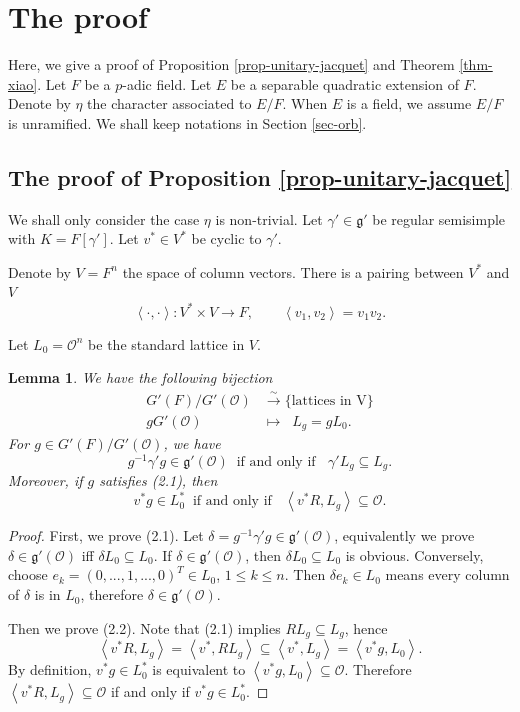 \documentclass[a4paper]{amsart}
\newcommand{\CO}{{\mathcal {O}}} \newcommand{\CP}{{\mathcal {P}}}
\newcommand{\fg}{{\mathfrak{g}}} \newcommand{\fh}{{\mathfrak{h}}}
\newcommand{\lra}{\longrightarrow}\newcommand{\lla}{\longleftarrow}
\theoremstyle{plain}
\newtheorem{lem}[thm]{Lemma}  \newtheorem{prop}[thm]{Proposition}
\theoremstyle{remark} \newtheorem{remark}[thm]{Remark}
\theoremstyle{exercise} \newtheorem{exercise}[thm]{Exercise}
\theoremstyle{example} \newtheorem{example}[thm]{Example}
\theoremstyle{question} \newtheorem{question}[thm]{Question}
\theoremstyle{assumption} \newtheorem{assumption}[thm]{Assumption}
\numberwithin{equation}{section}
\begin{document}
\section{The proof}

Here, we give a proof of Proposition \ref{prop-unitary-jacquet} and Theorem \ref{thm-xiao}. Let $F$ be a $p$-adic field. Let $E$ be a separable quadratic extension of $F$. Denote by $\eta$ the character associated to $E/F$. When $E$ is a field, we assume $E/F$ is unramified. We shall keep notations in Section \ref{sec-orb}.



\subsection{The proof of Proposition \ref{prop-unitary-jacquet}}
\label{sec-proof-unitary-jacquet}

We shall only consider the case $\eta$ is non-trivial. Let
$\gamma' \in \fg'$ be regular semisimple with $K = F[\gamma']$.
Let $v^* \in V^*$ be cyclic to $\gamma'$.

Denote by $V=F^n$  the space of column vectors. There is a pairing between $V^*$ and $V$
\[
    \left\langle \cdot,\cdot\right\rangle:V^*\times V\to F,\qquad\left\langle v_1,v_2\right\rangle=v_1v_2.
\]

Let $L_0=\CO^n$ be the standard lattice in $V$.
\begin{lem}\label{lem-5}
We have the following bijection
\begin{align*}
    G'(F)/G'(\CO)&\stackrel{\sim}{\lra}\{\text{lattices in V}\}\\gG'(\CO)&\longmapsto \;\; L_g = gL_0.
\end{align*}
For $g\in G'(F)/G'(\CO)$, we have 
\begin{equation}
    g^{-1}\gamma'g\in\fg'(\CO) \;\;\text{if and only if }\;\; \gamma' L_g\subseteq L_g.
\end{equation}
Moreover, if $g$ satisfies (2.1), then
\begin{equation}
    v^*g\in L_0^*\;\;\text{if and only if }\;\; \left\langle v^*R,L_g\right\rangle \subseteq\CO.
\end{equation}

\end{lem}
\begin{proof}
First, we prove (2.1). Let $\delta=g^{-1}\gamma'g\in\fg'(\CO)$, equivalently we prove    
$\delta\in\fg'(\CO)$ iff $\delta L_0\subseteq L_0$.
If $\delta\in \fg'(\CO)$, then $\delta L_0\subseteq L_0$ is obvious. Conversely, choose $e_k=(0,...,1,...,0)^T\in L_0$, $1\leq k\leq n$. Then $\delta e_k\in L_0$ means every column of $\delta$ is in $L_0$, therefore $\delta\in \fg'(\CO)$.

 Then we prove (2.2). Note that (2.1) implies $RL_g\subseteq L_g$, hence \[\left\langle v^*R,L_g\right\rangle=\left\langle v^*,RL_g\right\rangle\subseteq\left\langle v^*,L_g\right\rangle=\left\langle v^*g,L_0\right\rangle.\]
By definition, $v^*g\in L_0^*$ is equivalent to $\left\langle v^*g,L_0\right\rangle \subseteq \CO$. Therefore $ \left\langle v^*R,L_g\right\rangle\subseteq\CO$ if and only if $v^*g\in L_0^*$.
\end{proof}
\end{document}
